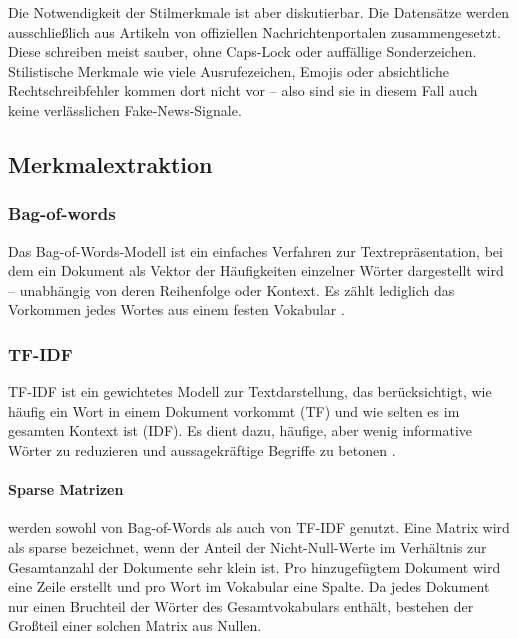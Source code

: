 Die Notwendigkeit der Stilmerkmale ist aber diskutierbar. Die Datensätze werden ausschließlich aus Artikeln von offiziellen
Nachrichtenportalen zusammengesetzt. Diese schreiben meist sauber, ohne Caps-Lock oder auffällige Sonderzeichen. Stilistische Merkmale wie viele 
Ausrufezeichen, Emojis oder absichtliche Rechtschreibfehler kommen dort nicht vor – also sind sie in diesem Fall auch keine verlässlichen Fake-News-Signale.

\subsection{Merkmalextraktion}
\label{sec:merkmalextraktion}


\subsubsection{Bag-of-words}
\label{sec:bag_of_words}

Das Bag-of-Words-Modell ist ein einfaches Verfahren zur Textrepräsentation, bei dem ein Dokument als Vektor der Häufigkeiten 
einzelner Wörter dargestellt wird – unabhängig von deren Reihenfolge oder Kontext. Es zählt lediglich das Vorkommen jedes Wortes aus 
einem festen Vokabular \cite{cichosz2018forum}.

\subsubsection{TF-IDF}

TF-IDF ist ein gewichtetes Modell zur Textdarstellung, das berücksichtigt, wie häufig ein Wort in einem Dokument vorkommt (TF) 
und wie selten es im gesamten Kontext ist (IDF). Es dient dazu, häufige, aber wenig informative Wörter zu reduzieren und 
aussagekräftige Begriffe zu betonen \cite{elov2023uzbek}.

\paragraph{Sparse Matrizen} werden sowohl von Bag-of-Words als auch von TF-IDF genutzt. Eine Matrix wird als sparse bezeichnet, 
wenn der Anteil der Nicht-Null-Werte im Verhältnis zur Gesamtanzahl der Dokumente sehr klein ist. Pro hinzugefügtem Dokument wird eine Zeile 
erstellt und pro Wort im Vokabular eine Spalte. Da jedes Dokument nur einen Bruchteil der Wörter des Gesamtvokabulars enthält, bestehen
der Großteil einer solchen Matrix aus Nullen.

